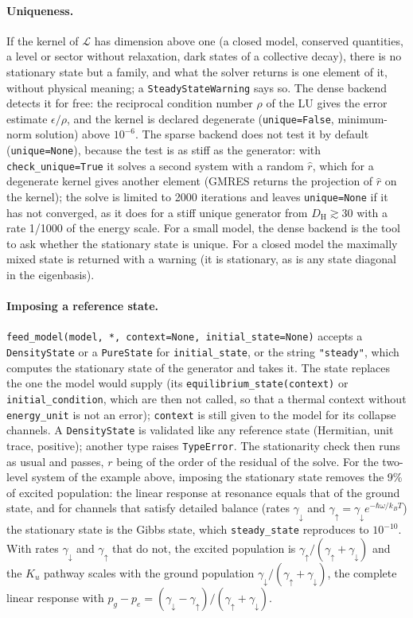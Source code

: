 \documentclass[11pt]{article}
\begin{document}
\paragraph{Uniqueness.} If the kernel of $\mathcal{L}$ has dimension above one (a closed model, conserved quantities, a level or sector without relaxation, dark states of a collective decay), there is no stationary state but a family, and what the solver returns is one element of it, without physical meaning; a \texttt{SteadyStateWarning} says so. The dense backend detects it for free: the reciprocal condition number $\rho$ of the LU gives the error estimate $\epsilon/\rho$, and the kernel is declared degenerate (\texttt{unique=False}, minimum-norm solution) above $10^{-6}$. The sparse backend does not test it by default (\texttt{unique=None}), because the test is as stiff as the generator: with \texttt{check\_unique=True} it solves a second system with a random $\hat r$, which for a degenerate kernel gives another element (GMRES returns the projection of $\hat r$ on the kernel); the solve is limited to 2000 iterations and leaves \texttt{unique=None} if it has not converged, as it does for a stiff unique generator from $D_{\mathrm H}\gtrsim30$ with a rate 1/1000 of the energy scale. For a small model, the dense backend is the tool to ask whether the stationary state is unique. For a closed model the maximally mixed state is returned with a warning (it is stationary, as is any state diagonal in the eigenbasis).

\paragraph{Imposing a reference state.} \texttt{feed\_model(model, *, context=None, initial\_state=None)} accepts a \texttt{DensityState} or a \texttt{PureState} for \texttt{initial\_state}, or the string \texttt{"steady"}, which computes the stationary state of the generator and takes it. The state replaces the one the model would supply (its \texttt{equilibrium\_state(context)} or \texttt{initial\_condition}, which are then not called, so that a thermal context without \texttt{energy\_unit} is not an error); \texttt{context} is still given to the model for its collapse channels. A \texttt{DensityState} is validated like any reference state (Hermitian, unit trace, positive); another type raises \texttt{TypeError}. The stationarity check then runs as usual and passes, $r$ being of the order of the residual of the solve. For the two-level system of the example above, imposing the stationary state removes the 9\% of excited population: the linear response at resonance equals that of the ground state, and for channels that satisfy detailed balance (rates $\gamma_\downarrow$ and $\gamma_\uparrow=\gamma_\downarrow e^{-\hbar\omega/k_BT}$) the stationary state is the Gibbs state, which \texttt{steady\_state} reproduces to $10^{-10}$. With rates $\gamma_\downarrow$ and $\gamma_\uparrow$ that do not, the excited population is $\gamma_\uparrow/(\gamma_\uparrow+\gamma_\downarrow)$ and the $K_u$ pathway scales with the ground population $\gamma_\downarrow/(\gamma_\uparrow+\gamma_\downarrow)$, the complete linear response with $p_g-p_e=(\gamma_\downarrow-\gamma_\uparrow)/(\gamma_\uparrow+\gamma_\downarrow)$.
\end{document}
